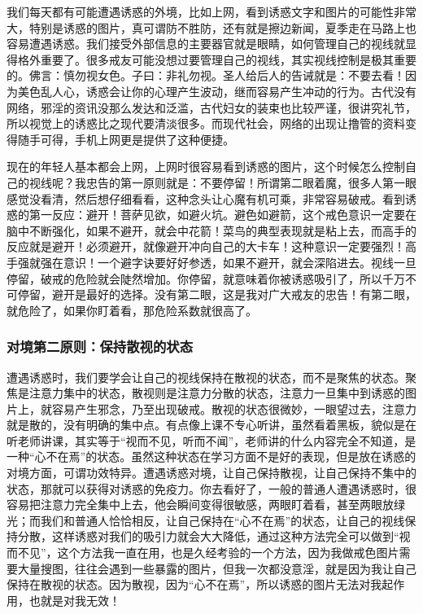 我们每天都有可能遭遇诱惑的外境，比如上网，看到诱惑文字和图片的可能性非常大，特别是诱惑的图片，真可谓防不胜防，还有就是擦边新闻，夏季走在马路上也容易遭遇诱惑。我们接受外部信息的主要器官就是眼睛，如何管理自己的视线就显得格外重要了。很多戒友可能没想过要管理自己的视线，其实视线控制是极其重要的。佛言：慎勿视女色。子曰：非礼勿视。圣人给后人的告诫就是：不要去看！因为美色乱人心，诱惑会让你的心理产生波动，继而容易产生冲动的行为。古代没有网络，邪淫的资讯没那么发达和泛滥，古代妇女的装束也比较严谨，很讲究礼节，所以视觉上的诱惑比之现代要清淡很多。而现代社会，网络的出现让撸管的资料变得随手可得，手机上网更是提供了这种便捷。

现在的年轻人基本都会上网，上网时很容易看到诱惑的图片，这个时候怎么控制自己的视线呢？我忠告的第一原则就是：不要停留！所谓第二眼着魔，很多人第一眼感觉没看清，然后想仔细看看，这种念头让心魔有机可乘，非常容易破戒。看到诱惑的第一反应：避开！菩萨见欲，如避火坑。避色如避箭，这个戒色意识一定要在脑中不断强化，如果不避开，就会中花箭！菜鸟的典型表现就是粘上去，而高手的反应就是避开！必须避开，就像避开冲向自己的大卡车！这种意识一定要强烈！高手强就强在意识！一个避字诀要好好参透，如果不避开，就会深陷进去。视线一旦停留，破戒的危险就会陡然增加。你停留，就意味着你被诱惑吸引了，所以千万不可停留，避开是最好的选择。没有第二眼，这是我对广大戒友的忠告！有第二眼，就危险了，如果你盯着看，那危险系数就很高了。

\subsubsection{对境第二原则：保持散视的状态}

遭遇诱惑时，我们要学会让自己的视线保持在散视的状态，而不是聚焦的状态。聚焦是注意力集中的状态，散视则是注意力分散的状态，注意力一旦集中到诱惑的图片上，就容易产生邪念，乃至出现破戒。散视的状态很微妙，一眼望过去，注意力就是散的，没有明确的集中点。有点像上课不专心听讲，虽然看着黑板，貌似是在听老师讲课，其实等于“视而不见，听而不闻”，老师讲的什么内容完全不知道，是一种“心不在焉”的状态。虽然这种状态在学习方面不是好的表现，但是放在诱惑的对境方面，可谓功效特异。遭遇诱惑对境，让自己保持散视，让自己保持不集中的状态，那就可以获得对诱惑的免疫力。你去看好了，一般的普通人遭遇诱惑时，很容易把注意力完全集中上去，他会瞬间变得很敏感，两眼盯着看，甚至两眼放绿光；而我们和普通人恰恰相反，让自己保持在“心不在焉”的状态，让自己的视线保持分散，这样诱惑对我们的吸引力就会大大降低，通过这种方法完全可以做到“视而不见”，这个方法我一直在用，也是久经考验的一个方法，因为我做戒色图片需要大量搜图，往往会遇到一些暴露的图片，但我一次都没意淫，就是因为我让自己保持在散视的状态。因为散视，因为“心不在焉”，所以诱惑的图片无法对我起作用，也就是对我无效！

